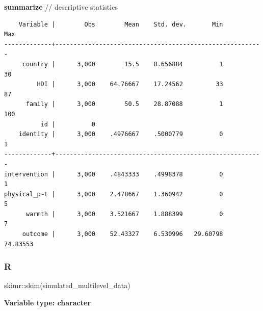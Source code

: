 \documentclass[
  letterpaper,
  DIV=11,
  numbers=noendperiod]{scrreprt}
\newenvironment{Shaded}{\begin{snugshade}}{\end{snugshade}}
\newcommand{\CommentTok}[1]{\textcolor[rgb]{0.37,0.37,0.37}{#1}}
\newcommand{\FunctionTok}[1]{\textcolor[rgb]{0.28,0.35,0.67}{#1}}
\newcommand{\KeywordTok}[1]{\textcolor[rgb]{0.00,0.23,0.31}{\textbf{#1}}}
\newcommand{\NormalTok}[1]{\textcolor[rgb]{0.00,0.23,0.31}{#1}}
\newcommand{\SpecialCharTok}[1]{\textcolor[rgb]{0.37,0.37,0.37}{#1}}
\begin{document}
\begin{Shaded}
\begin{Highlighting}[]

\KeywordTok{summarize} \CommentTok{// descriptive statistics}
\end{Highlighting}
\end{Shaded}

\begin{verbatim}
    Variable |        Obs        Mean    Std. dev.       Min        Max
-------------+---------------------------------------------------------
     country |      3,000        15.5    8.656884          1         30
         HDI |      3,000    64.76667    17.24562         33         87
      family |      3,000        50.5    28.87088          1        100
          id |          0
    identity |      3,000    .4976667    .5000779          0          1
-------------+---------------------------------------------------------
intervention |      3,000    .4843333    .4998378          0          1
physical_p~t |      3,000    2.478667    1.360942          0          5
      warmth |      3,000    3.521667    1.888399          0          7
     outcome |      3,000    52.43327    6.530996   29.60798   74.83553
\end{verbatim}

\subsubsection{R}

\begin{Shaded}
\begin{Highlighting}[]
\NormalTok{skimr}\SpecialCharTok{::}\FunctionTok{skim}\NormalTok{(simulated\_multilevel\_data)}
\end{Highlighting}
\end{Shaded}

\textbf{Variable type: character}
\end{document}
